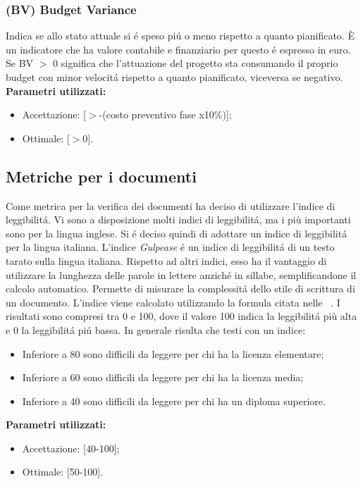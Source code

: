 \subsubsection{(BV) Budget Variance}
Indica se allo stato attuale si \'e speso pi\'u o meno rispetto a quanto pianificato.
È un indicatore che ha valore contabile e finanziario per questo \'e espresso in euro.
Se BV $>$ 0 significa che l’attuazione del progetto sta consumando il proprio budget con minor velocit\'a rispetto a quanto pianificato, viceversa se negativo.
\textbf{Parametri utilizzati:}\\
\begin{itemize}
\item Accettazione: [$>$-(costo preventivo fase x10\%)];
\item Ottimale: [$>$0].
\end{itemize}

\subsection{Metriche per i documenti}
Come metrica per la verifica dei documenti \gruppo ha deciso di utilizzare l’indice di leggibilit\'a.
Vi sono a disposizione molti indici di leggibilit\'a, ma i più importanti sono per la lingua inglese. Si \'e deciso quindi di adottare un indice di leggibilit\'a per la lingua italiana.
L’indice \textit{Gulpease} \'e un indice di leggibilit\'a di un testo tarato sulla lingua italiana. Rispetto ad altri indici, esso ha il vantaggio di utilizzare la lunghezza delle parole in lettere anzich\'e in sillabe, semplificandone il calcolo automatico. Permette di misurare la complessit\'a dello stile di scrittura di un documento.
L’indice viene calcolato utilizzando la formula citata nelle \infoNDP~.
I risultati sono compresi tra 0 e 100, dove il valore 100 indica la leggibilit\'a più alta e 0 la leggibilit\'a pi\'u bassa. In generale risulta che testi con un indice:
\begin{itemize}
\item Inferiore a 80 sono difficili da leggere per chi ha la licenza elementare;
\item Inferiore a 60 sono difficili da leggere per chi ha la licenza media;
\item Inferiore a 40 sono difficili da leggere per chi ha un diploma superiore.
\end{itemize}
\textbf{Parametri utilizzati:}
\begin{itemize}
\item Accettazione: [40-100];
\item Ottimale: [50-100].
\end{itemize}
